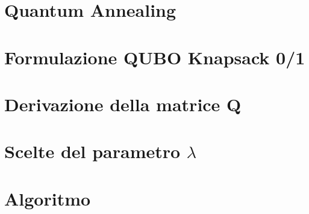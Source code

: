 \section{Quantum Annealing}
 
\section{Formulazione QUBO Knapsack 0/1}
 
\section{Derivazione della matrice Q}

\section{Scelte del parametro $\lambda$}
 
\section{Algoritmo}

